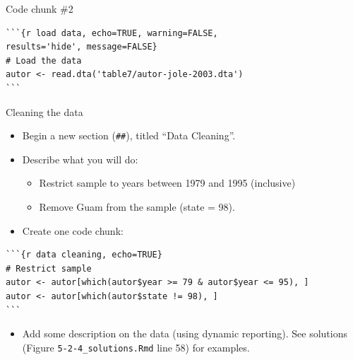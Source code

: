 \documentclass[ignorenonframetext,]{beamer}
\providecommand{\tightlist}{%
  \setlength{\itemsep}{0pt}\setlength{\parskip}{0pt}}
\begin{document}
\begin{frame}[fragile]{Code chunk \#2}
\protect\hypertarget{code-chunk-2}{}

\begin{verbatim}
```{r load data, echo=TRUE, warning=FALSE, 
results='hide', message=FALSE}
# Load the data
autor <- read.dta('table7/autor-jole-2003.dta')
```
\end{verbatim}

\end{frame}

\begin{frame}[fragile]{Cleaning the data}
\protect\hypertarget{cleaning-the-data}{}

\begin{itemize}
\tightlist
\item
  Begin a new section (\texttt{\#\#}), titled ``Data Cleaning''.\\
\item
  Describe what you will do:

  \begin{itemize}
  \tightlist
  \item
    Restrict sample to years between 1979 and 1995 (inclusive)\\
  \item
    Remove Guam from the sample (state = 98).\\
  \end{itemize}
\item
  Create one code chunk:\\
\end{itemize}

\begin{verbatim}
```{r data cleaning, echo=TRUE}
# Restrict sample
autor <- autor[which(autor$year >= 79 & autor$year <= 95), ]
autor <- autor[which(autor$state != 98), ]
```
\end{verbatim}

\begin{itemize}
\tightlist
\item
  Add some description on the data (using dynamic reporting). See
  solutions (Figure \texttt{5-2-4\_solutions.Rmd} line 58) for examples.
\end{itemize}

\end{frame}
\end{document}
